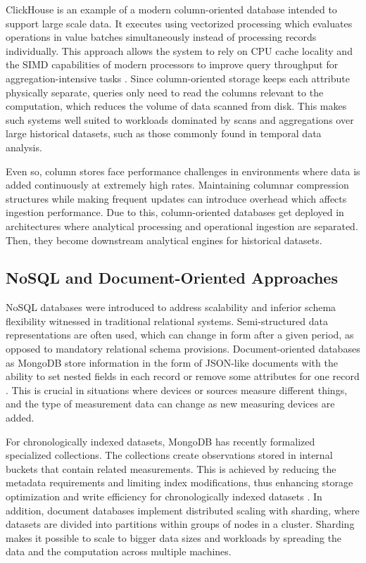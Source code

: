 ClickHouse is an example of a modern column-oriented database intended to support large scale data. It executes using vectorized processing which evaluates operations in value batches simultaneously instead of processing records individually. This approach allows the system to rely on CPU cache locality and the SIMD capabilities of modern processors to improve query throughput for aggregation-intensive tasks \cite{clickhouse_architecture}. Since column-oriented storage keeps each attribute physically separate, queries only need to read the columns relevant to the computation, which reduces the volume of data scanned from disk. This makes such systems well suited to workloads dominated by scans and aggregations over large historical datasets, such as those commonly found in temporal data analysis.

Even so, column stores face performance challenges in environments where data is added continuously at extremely high rates. Maintaining columnar compression structures while making frequent updates can introduce overhead which affects ingestion performance. Due to this, column-oriented databases get deployed in architectures where analytical processing and operational ingestion are separated. Then, they become downstream analytical engines for historical datasets. 


\subsection{NoSQL and Document-Oriented Approaches}
NoSQL databases were introduced to address scalability and inferior schema flexibility witnessed in traditional relational systems. Semi-structured data representations are often used, which can change in form after a given period, as opposed to mandatory relational schema provisions. Document-oriented databases as MongoDB store information in the form of JSON-like documents with the ability to set nested fields in each record or remove some attributes for one record \cite{mongodb_documents}. This is crucial in situations where devices or sources measure different things, and the type of measurement data can change as new measuring devices are added. 

For chronologically indexed datasets, MongoDB has recently formalized specialized collections. The collections create observations stored in internal buckets that contain related measurements. This is achieved by reducing the metadata requirements and limiting index modifications, thus enhancing storage optimization and write efficiency for chronologically indexed datasets \cite{mongodb_timeseries_collections}. In addition, document databases implement distributed scaling with sharding, where datasets are divided into partitions within groups of nodes in a cluster. Sharding makes it possible to scale to bigger data sizes and workloads by spreading the data and the computation across multiple machines.

